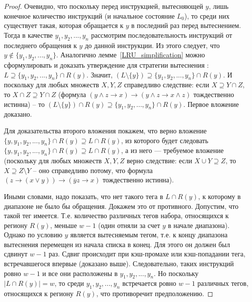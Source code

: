 \begin{proof}
  Очевидно, что поскольку перед инструкцией, вытесняющей $y$, лишь
  конечное количество инструкций (и начальное состояние $L_0$), то
  среди них существует такая, которая обращается к $y$ в последний
  раз перед вытеснением. Тогда в качестве $y_1, y_2, ..., y_n$
  рассмотрим последовательность инструкций от последнего обращения к
  $y$ до данной инструкции. Из этого следует, что $y \notin \{y_1,
  y_2, ..., y_n\}$. Аналогично лемме~\ref{LRU_simplification} можно
  сформулировать и доказать утверждение для стратегии вытеснения \FIFO: $L
  \supseteq \{y_1, y_2, ..., y_n\} \cap R(y)$. Значит,
  $(L\setminus\{y\}) \supseteq \{y_1, y_2, ..., y_n\} \cap R(y)$. И
  поскольку для любых множеств $X, Y, Z$ справедливо следствие: если
  $X \supseteq Y \cap Z$, то $X\cap Z \supseteq Y \cap Z$ (формула
  $(y \wedge z \rightarrow x) \rightarrow (y \wedge z \rightarrow x
  \wedge z)$ тождественно истинна) -- то $(L\setminus\{y\}) \cap
  R(y) \supseteq \{y_1, y_2, ..., y_n\} \cap R(y)$. Первое вложение
  доказано.

  Для доказательства второго вложения покажем, что верно вложение\\
  $\{y, y_1, y_2, ..., y_n\} \cap R(y) \supseteq L \cap R(y)$, из
  которого будет следовать\\ $\{y, y_1, y_2, ..., y_n\} \cap R(y) \supseteq L \cap
  R(y)$, а из него --- требуемое вложение (поскольку для любых
  множеств $X, Y, Z$ верно следствие: если $X \cup Y\supseteq Z$,
  то $X \supseteq Z \setminus Y$ -- оно справедливо потому, что
  формула $(z \rightarrow (x \vee y))\rightarrow(\overline{y}z\rightarrow x)$
  тождественно истинна).

  Иными словами, надо показать, что нет такого тега в $L \cap R(y)$,
  к которому в диапазоне не было бы обращения. Докажем это от противного.
  Допустим, что такой тег имеется. Т.е. количество различных тегов набора,
  относящихся к региону $R(y)$, меньше $w-1$ (один отняли за счет $y$ в начале диапазона).
  Однако по условию $y$ является вытесняемым тегом, т.е. к
  концу диапазона вытеснения перемещен из начала списка в конец. Для
  этого он должен был сдвинут $w-1$ раз. Сдвиг происходит при
  кэш-промахе или кэш-попадании тега, встречавшегося впервые
  (доказано выше). Следовательно, таких инструкций ровно $w-1$ и все они расположены
  в $y_1, y_2, ..., y_n$. Но поскольку $| L \cap R(y) | = w$, то
  среди $y_1, y_2, ..., y_n$ встречается ровно $w-1$ различных
  тегов, относящихся к региону $R(y)$, что противоречит
  предположению.
\end{proof}



